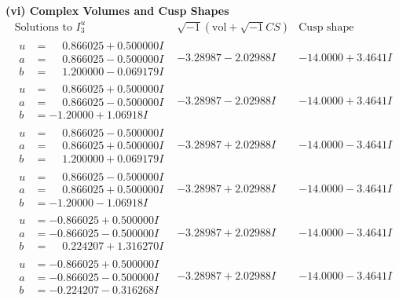 \documentclass[1p]{elsarticle_modified}
\theoremstyle{definition}
\newcommand{\I}{\sqrt{-1}}
\begin{document}
\newpage\flushleft \textbf{(vi) Complex Volumes and Cusp Shapes}
$$\begin{array}{c|c|c}  
\text{Solutions to }I^u_{3}& \I (\text{vol} + \sqrt{-1}CS) & \text{Cusp shape}\\
 \hline 
\begin{aligned}
u &= \phantom{-}0.866025 + 0.500000 I \\
a &= \phantom{-}0.866025 - 0.500000 I \\
b &= \phantom{-}1.200000 - 0.069179 I\end{aligned}
 & -3.28987 - 2.02988 I & -14.0000 + 3.4641 I \\ \hline\begin{aligned}
u &= \phantom{-}0.866025 + 0.500000 I \\
a &= \phantom{-}0.866025 - 0.500000 I \\
b &= -1.20000 + 1.06918 I\end{aligned}
 & -3.28987 - 2.02988 I & -14.0000 + 3.4641 I \\ \hline\begin{aligned}
u &= \phantom{-}0.866025 - 0.500000 I \\
a &= \phantom{-}0.866025 + 0.500000 I \\
b &= \phantom{-}1.200000 + 0.069179 I\end{aligned}
 & -3.28987 + 2.02988 I & -14.0000 - 3.4641 I \\ \hline\begin{aligned}
u &= \phantom{-}0.866025 - 0.500000 I \\
a &= \phantom{-}0.866025 + 0.500000 I \\
b &= -1.20000 - 1.06918 I\end{aligned}
 & -3.28987 + 2.02988 I & -14.0000 - 3.4641 I \\ \hline\begin{aligned}
u &= -0.866025 + 0.500000 I \\
a &= -0.866025 - 0.500000 I \\
b &= \phantom{-}0.224207 + 1.316270 I\end{aligned}
 & -3.28987 + 2.02988 I & -14.0000 - 3.4641 I \\ \hline\begin{aligned}
u &= -0.866025 + 0.500000 I \\
a &= -0.866025 - 0.500000 I \\
b &= -0.224207 - 0.316268 I\end{aligned}
 & -3.28987 + 2.02988 I & -14.0000 - 3.4641 I \\ \hline\begin{aligned}

\end{aligned}
\end{array}$$
\end{document}
